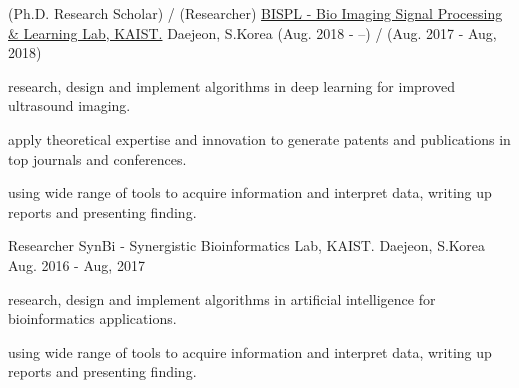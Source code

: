 

\begin{cventries}

  \cventry
    {(Ph.D. Research Scholar) / (Researcher)} %
    {\href{https://bispl.weebly.com}{BISPL - Bio Imaging Signal Processing \& Learning Lab, KAIST.}} %
    {Daejeon, S.Korea} %
    {(Aug. 2018 - --) / (Aug. 2017 - Aug, 2018)} %
    {
      \begin{cvitems} %
        \item {research, design and implement algorithms in deep learning for improved ultrasound imaging.}
        \item {apply theoretical expertise and innovation to generate patents and publications in top journals and conferences.}
        \item {using wide range of tools to acquire information and interpret data, writing up reports and presenting finding.}
      \end{cvitems}
    }
    
  \cventry
    {Researcher} %
    {SynBi - Synergistic Bioinformatics Lab, KAIST.} %
    {Daejeon, S.Korea} %
    {Aug. 2016 - Aug, 2017} %
    {
      \begin{cvitems} %
        \item {research, design and implement algorithms in artificial intelligence for bioinformatics applications.}
        \item {using wide range of tools to acquire information and interpret data, writing up reports and presenting finding.}
      \end{cvitems}
    }


\end{cventries}
